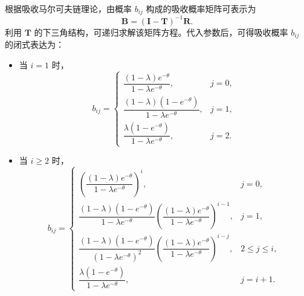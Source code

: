 根据吸收马尔可夫链理论\cite{2008_Markov_absorb}，由概率 $b_{ij}$ 构成的吸收概率矩阵可表示为
$$
\mathbf{B}=(\mathbf{I}-\mathbf{T})^{-1}\mathbf{R}.
$$
利用 $\mathbf{T}$ 的下三角结构，可递归求解该矩阵方程。代入参数后，可得吸收概率 $b_{ij}$ 的闭式表达为：
\begin{itemize}
\item 当 $i=1$ 时，
\begin{equation}
b_{ij}=\left\{
\begin{array}{ll}
\dfrac{(1-\lambda)e^{-\theta}}{1-\lambda e^{-\theta}}, & j=0,\\
\dfrac{(1-\lambda)(1-e^{-\theta})}{1-\lambda e^{-\theta}}, & j=1,\\
\dfrac{\lambda(1-e^{-\theta})}{1-\lambda e^{-\theta}}, & j=2.
\end{array}
\right.
\end{equation}

\item 当 $i\ge 2$ 时，
\begin{equation}
b_{ij}=\left\{
\begin{array}{ll}
\left(\dfrac{(1-\lambda)e^{-\theta}}{1-\lambda e^{-\theta}}\right)^i, & j=0,\\[6pt]
\dfrac{(1-\lambda)(1-e^{-\theta})}{1-\lambda e^{-\theta}}\left(\dfrac{(1-\lambda)e^{-\theta}}{1-\lambda e^{-\theta}}\right)^{i-1}, & j=1,\\[6pt]
\dfrac{(1-\lambda)(1-e^{-\theta})}{(1-\lambda e^{-\theta})^2}\left(\dfrac{(1-\lambda)e^{-\theta}}{1-\lambda e^{-\theta}}\right)^{i-j}, & 2\le j\le i,\\[6pt]
\dfrac{\lambda(1-e^{-\theta})}{1-\lambda e^{-\theta}}, & j=i+1.
\end{array}
\right.
\end{equation}
\end{itemize}


